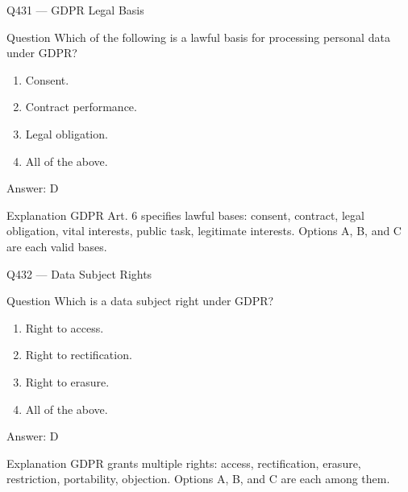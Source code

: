 \documentclass[aspectratio=169,8pt]{beamer}
\begin{document}
	\begin{frame}{Q431 --- GDPR Legal Basis}
		\begin{block}{Question}
			Which of the following is a lawful basis for processing personal data under GDPR?
			\begin{enumerate}
				\item Consent.
				\item Contract performance.
				\item Legal obligation.
				\item All of the above.
			\end{enumerate}
		\end{block}
		\begin{exampleblock}{Answer: D}\end{exampleblock}
		\begin{block}{Explanation}
			GDPR Art. 6 specifies lawful bases: consent, contract, legal obligation, vital interests, public task, legitimate interests. Options A, B, and C are each valid bases.
		\end{block}
	\end{frame}
	
	\begin{frame}{Q432 --- Data Subject Rights}
		\begin{block}{Question}
			Which is a data subject right under GDPR?
			\begin{enumerate}
				\item Right to access.
				\item Right to rectification.
				\item Right to erasure.
				\item All of the above.
			\end{enumerate}
		\end{block}
		\begin{exampleblock}{Answer: D}\end{exampleblock}
		\begin{block}{Explanation}
			GDPR grants multiple rights: access, rectification, erasure, restriction, portability, objection. Options A, B, and C are each among them.
		\end{block}
	\end{frame}
	
\end{document}
